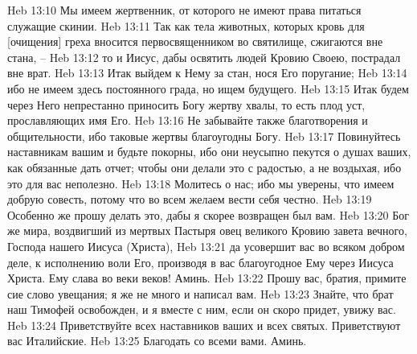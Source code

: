 Heb 13:10  Мы имеем жертвенник, от которого не имеют права питаться служащие скинии.
Heb 13:11  Так как тела животных, которых кровь для [очищения] греха вносится первосвященником во святилище, сжигаются вне стана, --
Heb 13:12  то и Иисус, дабы освятить людей Кровию Своею, пострадал вне врат.
Heb 13:13  Итак выйдем к Нему за стан, нося Его поругание;
Heb 13:14  ибо не имеем здесь постоянного града, но ищем будущего.
Heb 13:15  Итак будем через Него непрестанно приносить Богу жертву хвалы, то есть плод уст, прославляющих имя Его.
Heb 13:16  Не забывайте также благотворения и общительности, ибо таковые жертвы благоугодны Богу.
Heb 13:17  Повинуйтесь наставникам вашим и будьте покорны, ибо они неусыпно пекутся о душах ваших, как обязанные дать отчет; чтобы они делали это с радостью, а не воздыхая, ибо это для вас неполезно.
Heb 13:18  Молитесь о нас; ибо мы уверены, что имеем добрую совесть, потому что во всем желаем вести себя честно.
Heb 13:19  Особенно же прошу делать это, дабы я скорее возвращен был вам.
Heb 13:20  Бог же мира, воздвигший из мертвых Пастыря овец великого Кровию завета вечного, Господа нашего Иисуса (Христа),
Heb 13:21  да усовершит вас во всяком добром деле, к исполнению воли Его, производя в вас благоугодное Ему через Иисуса Христа. Ему слава во веки веков! Аминь.
Heb 13:22  Прошу вас, братия, примите сие слово увещания; я же не много и написал вам.
Heb 13:23  Знайте, что брат наш Тимофей освобожден, и я вместе с ним, если он скоро придет, увижу вас.
Heb 13:24  Приветствуйте всех наставников ваших и всех святых. Приветствуют вас Италийские.
Heb 13:25  Благодать со всеми вами. Аминь.


